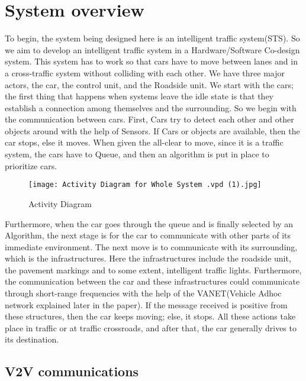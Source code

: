 \documentclass[conference]{IEEEtran}
\begin{document}
\section{System overview}
To begin, the system being designed here is an intelligent traffic system(STS). So we aim to develop an intelligent traffic system in a Hardware/Software Co-design system. This system has to work so that cars have to move between lanes and in a cross-traffic system without colliding with each other.  We have three major actors, the car, the control unit, and the Roadside unit. We start with the cars; the first thing that happens when systems leave the idle state is that they establish a connection among themselves and the surrounding. So we begin with the communication between cars. First, Cars try to detect each other and other objects around with the help of Sensors. If Cars or objects are available, then the car stops, else it moves. When given the all-clear to move, since it is a traffic system, the cars have to Queue, and then an algorithm is put in place to prioritize cars.

\vspace{3mm}

\begin{figure}[htp]
    \centering
    \texttt{[image: Activity Diagram for Whole System .vpd (1).jpg]}
    \caption{Activity Diagram}
    \label{fig:reg-gen}
\end{figure}


Furthermore, when the car goes through the queue and is finally selected by an Algorithm, the next stage is for the car to communicate with other parts of its immediate environment. The next move is to communicate with its surrounding, which is the infrastructures. Here the infrastructures include the roadside unit, the pavement markings and to some extent, intelligent traffic lights. Furthermore, the communication between the car and these infrastructures could communicate through short-range frequencies with the help of the VANET(Vehicle Adhoc network explained later in the paper). If the message received is positive from these structures, then the car keeps moving; else, it stops. All these actions take place in traffic or at traffic crossroads, and after that, the car generally drives to its destination.

\subsection{V2V communications }
\end{document}
